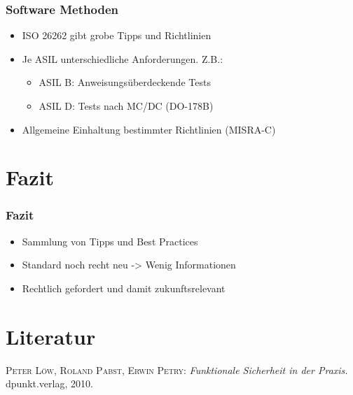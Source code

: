 \documentclass[]{beamer}
\begin{document}
\begin{frame}
\frametitle{Software Methoden}

\begin{itemize}
    \item ISO 26262 gibt grobe Tipps und Richtlinien
    \item Je ASIL unterschiedliche Anforderungen. Z.B.:
    \begin{itemize}
        \item ASIL B: Anweisungsüberdeckende Tests
        \item ASIL D: Tests nach MC/DC (DO-178B)
    \end{itemize}
    \item Allgemeine Einhaltung bestimmter Richtlinien (MISRA-C)
\end{itemize}

\end{frame}



\section{Fazit}
\label{sec:Fazit}

\begin{frame}
\frametitle{Fazit}

\begin{itemize}
    \item Sammlung von Tipps und Best Practices
    \item Standard noch recht neu -> Wenig Informationen
    \item Rechtlich gefordert und damit zukunftsrelevant
\end{itemize}

\end{frame}








\appendix
\section*{Literatur}
\label{sec:Literatur}

\begin{frame}
\begin{thebibliography}{10}

 \textsc{Peter Löw, Roland Pabst, Erwin Petry}: {\em Funktionale Sicherheit in der Praxis.} dpunkt.verlag, 2010.

\end{thebibliography}
\end{frame}
\end{document}
